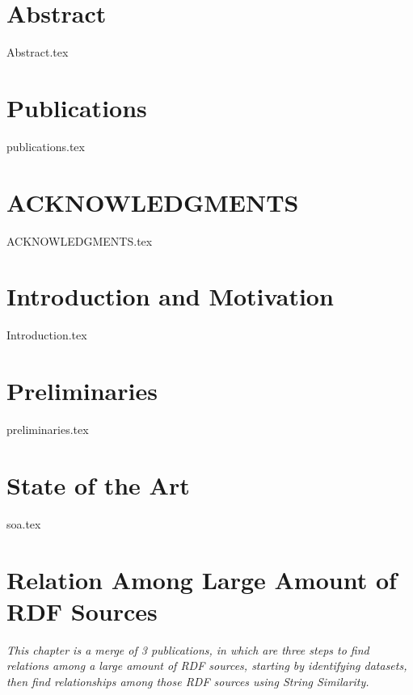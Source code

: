 \documentclass[ oneside,openright,titlepage,numbers=noenddot,headinclude,%
                footinclude=true,cleardoublepage=empty,abstractoff, %
                BCOR=5mm,paper=a4,fontsize=11pt,%
                 ngerman,american,%
                ]{scrreprt}
\begin{document}
\sloppy
{}

\renewcommand{\thepage}{\Roman{page}}






\newpage
\chapter*{Abstract}
{Abstract.tex}

\newpage
\chapter*{Publications}
{publications.tex}

\newpage
\chapter*{ACKNOWLEDGMENTS}
{ACKNOWLEDGMENTS.tex}



\newpage
\chapter{Introduction and Motivation}

\renewcommand{\thepage}{\arabic{page}}
\setcounter{page}{1}

{Introduction.tex}

\newpage
\chapter{Preliminaries} \label{ch:preliminaries}
{preliminaries.tex}

\newpage
\chapter{State of the Art} \label{ch:soa}
{soa.tex}

\newpage
\chapter{Relation Among Large Amount of RDF Sources} \label{ch:relating}
\textit{This chapter is a merge of 3 publications, in which are three steps to find relations among a large amount of RDF sources, starting by identifying datasets, then find relationships among those RDF sources using String Similarity.}
\end{document}
